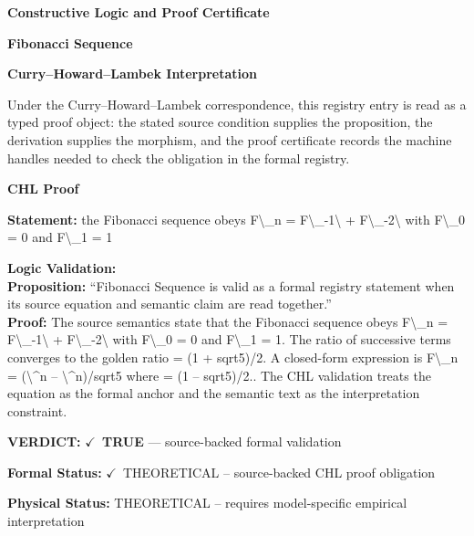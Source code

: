 \clearpage
\begingroup\tzpsupportsetup
\noindent\textbf{\fontsize{10.8pt}{12.8pt}\selectfont [ID 0109] Constructive Logic and Proof Certificate}\par
\noindent\textbf{\fontsize{10pt}{12pt}\selectfont Fibonacci Sequence}\par
\vspace{0.45em}
\begingroup
\footnotesize
\setlength{\parskip}{0.22em}
\setlength{\parindent}{0pt}
\noindent\textbf{Curry--Howard--Lambek Interpretation}\par
Under the Curry--Howard--Lambek correspondence, this registry entry is read as a typed proof
object: the stated source condition supplies the proposition, the derivation supplies the
morphism, and the proof certificate records the machine handles needed to check the obligation
in the formal registry.

\vspace{0.45em}
\noindent\textbf{CHL Proof}\par
\textbf{Statement:} the Fibonacci sequence obeys F\textbackslash{}\_n = F\textbackslash{}\_-1\textbackslash{} + F\textbackslash{}\_-2\textbackslash{} with F\textbackslash{}\_0 = 0 and F\textbackslash{}\_1 = 1

\textbf{Logic Validation:}\\
\textbf{Proposition:} ``Fibonacci Sequence is valid as a formal registry statement when its source equation and
semantic claim are read together.''\\
\textbf{Proof:} The source semantics state that the Fibonacci sequence obeys F\textbackslash{}\_n = F\textbackslash{}\_-1\textbackslash{} + F\textbackslash{}\_-2\textbackslash{} with
F\textbackslash{}\_0 = 0 and F\textbackslash{}\_1 = 1. The ratio of successive terms converges to the golden ratio  =
(1 + sqrt5)/2. A closed-form expression is F\textbackslash{}\_n = (\textbackslash{}\textasciicircum{}n -- \textbackslash{}\textasciicircum{}n)/sqrt5 where  = (1
-- sqrt5)/2.. The CHL validation treats the equation as the formal anchor and the
semantic text as the interpretation constraint.

\textbf{VERDICT:} \ensuremath{\checkmark}\ \textbf{TRUE} --- source-backed formal validation

\textbf{Formal Status:} \ensuremath{\checkmark}\ THEORETICAL -- source-backed CHL proof obligation

\textbf{Physical Status:} THEORETICAL -- requires model-specific empirical interpretation
\par\vspace{0.45em}
\par
\ifTZPDarkEdition
{}
\fi
\endgroup
\endgroup
